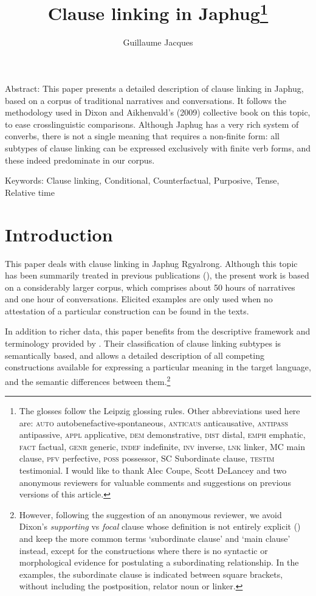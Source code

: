 \documentclass[oldfontcommands,oneside,a4paper,11pt]{article}
\begin{document}
 
\linenumbers
\title{Clause linking in Japhug\footnote{
The glosses follow the Leipzig glossing rules. Other abbreviations used here are: \textsc{auto}  autobenefactive-spontaneous, \textsc{anticaus} anticausative, \textsc{antipass} antipassive, \textsc{appl} applicative, \textsc{dem} demonstrative,  \textsc{dist} distal, \textsc{emph} emphatic, \textsc{fact} factual, \textsc{genr} generic, \textsc{indef} indefinite, \textsc{inv} inverse,  \textsc{lnk} linker, MC main clause, \textsc{pfv} perfective, \textsc{poss} possessor,  SC Subordinate clause, \textsc{testim} testimonial. I would like to thank Alec Coupe, Scott DeLancey and two anonymous reviewers for valuable comments and suggestions on previous versions of this article.
} }
\author{Guillaume Jacques}
\maketitle

Abstract: This paper presents a detailed description of clause linking in Japhug, based on a corpus of traditional narratives and conversations. It follows the methodology used in Dixon and Aikhenvald's (2009) collective book on this topic, to ease crosslinguistic comparisons. Although Japhug has a very rich system of converbs, there is not a single meaning that requires a non-finite form: all subtypes of clause linking can be expressed exclusively with finite verb forms, and these indeed predominate in our corpus.

Keywords: Clause linking, Conditional, Counterfactual, Purposive, Tense, Relative time 

\section{Introduction}

This paper  deals with clause linking in Japhug Rgyalrong. Although this topic has been summarily treated in previous publications (\citealt[317-325]{jacques08}), the present work is based on a considerably larger corpus, which comprises about 50 hours of narratives and one hour of conversations. Elicited examples are only used when no attestation of a particular construction can be found in the texts. 

In addition to richer data, this paper  benefits from the descriptive framework and terminology provided by \citet{dixon09clause.linking}. Their classification of clause linking subtypes is semantically based, and allows a detailed description of all competing constructions available for expressing a particular meaning in the target language, and the semantic differences between them.\footnote{However,  following the suggestion of an anonymous reviewer, we avoid  Dixon's   \textit{supporting}   vs \textit{focal} clause whose definition is not entirely explicit (\citealt[2-5]{dixon09intro}) and keep the  more common terms `subordinate clause' and `main clause'  instead, except for the constructions where there is no syntactic or morphological evidence for postulating a subordinating relationship. In the examples, the subordinate clause is indicated between square brackets, without including the postposition, relator noun or linker.}
\end{document}
